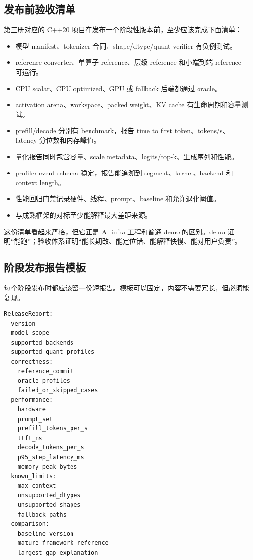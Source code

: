 \subsection{发布前验收清单}

第三册对应的 C++20 项目在发布一个阶段性版本前，至少应该完成下面清单：

\begin{rubricbox}
\begin{itemize}
  \item 模型 manifest、tokenizer 合同、shape/dtype/quant verifier 有负例测试。
  \item reference converter、单算子 reference、层级 reference 和小端到端 reference 可运行。
  \item CPU scalar、CPU optimized、GPU 或 fallback 后端都通过 oracle。
  \item activation arena、workspace、packed weight、KV cache 有生命周期和容量测试。
  \item prefill/decode 分别有 benchmark，报告 time to first token、tokens/s、latency 分位数和内存峰值。
  \item 量化报告同时包含容量、scale metadata、logits/top-k、生成序列和性能。
  \item profiler event schema 稳定，报告能追溯到 segment、kernel、backend 和 context length。
  \item 性能回归门禁记录硬件、线程、prompt、baseline 和允许退化阈值。
  \item 与成熟框架的对标至少能解释最大差距来源。
\end{itemize}
\end{rubricbox}

这份清单看起来严格，但它正是 AI infra 工程和普通 demo 的区别。demo 证明“能跑”；验收体系证明“能长期改、能定位错、能解释快慢、能对用户负责”。

\subsection{阶段发布报告模板}

每个阶段发布时都应该留一份短报告。模板可以固定，内容不需要冗长，但必须能复现。

\begin{lstlisting}[numbers=none,caption={阶段发布报告模板}]
ReleaseReport:
  version
  model_scope
  supported_backends
  supported_quant_profiles
  correctness:
    reference_commit
    oracle_profiles
    failed_or_skipped_cases
  performance:
    hardware
    prompt_set
    prefill_tokens_per_s
    ttft_ms
    decode_tokens_per_s
    p95_step_latency_ms
    memory_peak_bytes
  known_limits:
    max_context
    unsupported_dtypes
    unsupported_shapes
    fallback_paths
  comparison:
    baseline_version
    mature_framework_reference
    largest_gap_explanation
\end{lstlisting}

